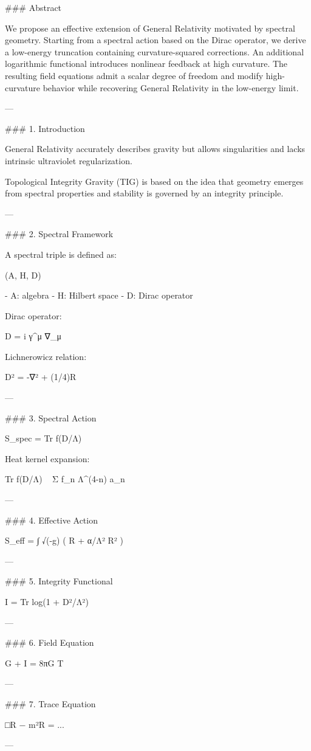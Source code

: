 ### Abstract

We propose an effective extension of General Relativity motivated by spectral geometry. Starting from a spectral action based on the Dirac operator, we derive a low-energy truncation containing curvature-squared corrections. An additional logarithmic functional introduces nonlinear feedback at high curvature. The resulting field equations admit a scalar degree of freedom and modify high-curvature behavior while recovering General Relativity in the low-energy limit.

---

### 1. Introduction

General Relativity accurately describes gravity but allows singularities and lacks intrinsic ultraviolet regularization.

Topological Integrity Gravity (TIG) is based on the idea that geometry emerges from spectral properties and stability is governed by an integrity principle.

---

### 2. Spectral Framework

A spectral triple is defined as:

(A, H, D)

- A: algebra
- H: Hilbert space
- D: Dirac operator

Dirac operator:

D = i γ^μ ∇_μ

Lichnerowicz relation:

D² = -∇² + (1/4)R

---

### 3. Spectral Action

S_spec = Tr f(D/Λ)

Heat kernel expansion:

Tr f(D/Λ) ~ Σ f_n Λ^(4-n) a_n

---

### 4. Effective Action

S_eff = ∫ √(-g) ( R + α/Λ² R² )

---

### 5. Integrity Functional

I = Tr log(1 + D²/Λ²)

---

### 6. Field Equation

G + I = 8πG T

---

### 7. Trace Equation

□R − m²R = ...

---

